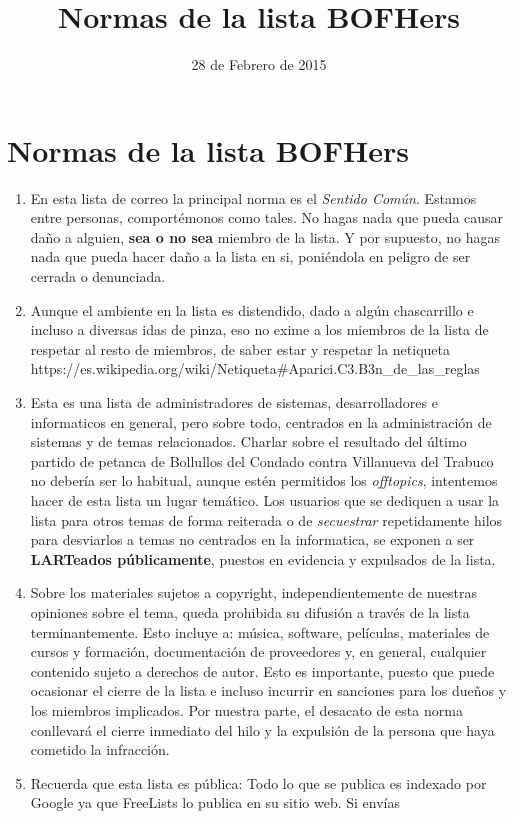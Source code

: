\documentclass[a4paper,12pt]{book}
\title{Normas de la lista BOFHers}
\date{28 de Febrero de 2015}
\begin{document}
\section{Normas de la lista BOFHers}
\begin{enumerate}[1.]
\item
  En esta lista de correo la principal norma es el \emph{Sentido Común}.
  Estamos entre personas, comportémonos como tales. No hagas nada que
  pueda causar daño a alguien, \textbf{sea o no sea} miembro de la
  lista. Y por supuesto, no hagas nada que pueda hacer daño a la lista
  en si, poniéndola en peligro de ser cerrada o denunciada.
\item
  Aunque el ambiente en la lista es distendido, dado a algún
  chascarrillo e incluso a diversas idas de pinza, eso no exime a los
  miembros de la lista de respetar al resto de miembros, de saber estar
  y respetar la netiqueta
  https://es.wikipedia.org/wiki/Netiqueta\#Aparici.C3.B3n\_de\_las\_reglas
\item
  Esta es una lista de administradores de sistemas, desarrolladores e
  informaticos en general, pero sobre todo, centrados en la
  administración de sistemas y de temas relacionados. Charlar sobre el
  resultado del último partido de petanca de Bollullos del Condado
  contra Villanueva del Trabuco no debería ser lo habitual, aunque estén
  permitidos los \emph{offtopics}, intentemos hacer de esta lista un
  lugar temático. Los usuarios que se dediquen a usar la lista para
  otros temas de forma reiterada o de \emph{secuestrar} repetidamente
  hilos para desviarlos a temas no centrados en la informatica, se
  exponen a ser \textbf{LARTeados públicamente}, puestos en evidencia y
  expulsados de la lista.
\item
  Sobre los materiales sujetos a copyright, independientemente de
  nuestras opiniones sobre el tema, queda prohibida su difusión a través
  de la lista terminantemente. Esto incluye a: música, software,
  películas, materiales de cursos y formación, documentación de
  proveedores y, en general, cualquier contenido sujeto a derechos de
  autor. Esto es importante, puesto que puede ocasionar el cierre de la
  lista e incluso incurrir en sanciones para los dueños y los miembros
  implicados. Por nuestra parte, el desacato de esta norma conllevará el
  cierre inmediato del hilo y la expulsión de la persona que haya
  cometido la infracción.
\item
  Recuerda que esta lista es pública: Todo lo que se publica es indexado
  por Google ya que FreeLists lo publica en su sitio web. Si envías

\end{enumerate}
\end{document}
